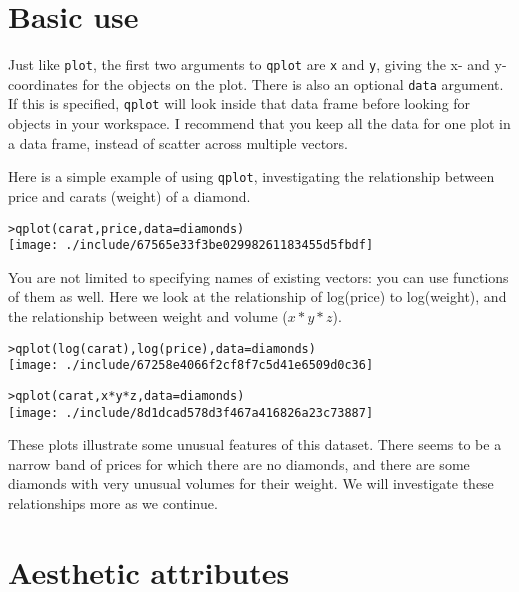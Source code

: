 \section{Basic use}\label{sec:basic_use}

Just like {\tt plot}, the first two arguments to {\tt qplot} are {\tt x} and {\tt y}, giving the x- and y-coordinates for the objects on the plot. There is also an optional {\tt data} argument.  If this is specified, {\tt qplot} will look inside that data frame before looking for objects in your workspace.  I recommend that you keep all the data for one plot in a data frame, instead of scatter across multiple vectors.

Here is a simple example of using {\tt qplot}, investigating the relationship between price and carats (weight) of a diamond.  

\begin{alltt}
> qplot(carat, price, data = diamonds)
\texttt{[image: ./include/67565e33f3be02998261183455d5fbdf]}

\end{alltt}

You are not limited to specifying names of existing vectors: you can use functions of them as well.  Here we look at the relationship of log(price) to log(weight), and the relationship between weight and volume ($x * y * z$).

\begin{alltt}
> qplot(log(carat), log(price), data = diamonds)
\texttt{[image: ./include/67258e4066f2cf8f7c5d41e6509d0c36]}

> qplot(carat, x * y * z, data = diamonds)
\texttt{[image: ./include/8d1dcad578d3f467a416826a23c73887]}

\end{alltt}

These plots illustrate some unusual features of this dataset.  There seems to be a narrow band of prices for which there are no diamonds, and there are some diamonds with very unusual volumes for their weight.  We will investigate these relationships more as we continue.

\section{Aesthetic attributes}\label{sec:aesthetic_attributes}

